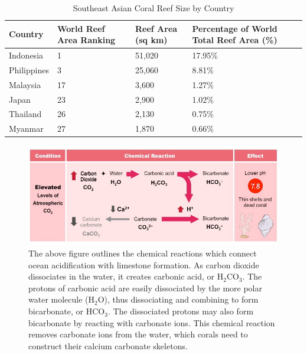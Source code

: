 \documentclass{book}\usepackage{knitr}
\begin{document}
\begin{knitrout}
\begin{kframe}
\begin{table}[h]
\caption{Southeast Asian Coral Reef Size by Country}
\label{tab:Southeast Asian Coral Reef Size by Country}
\begin{tabular}{llll}
Country     & World Reef Area Ranking & Reef Area (sq km) & Percentage of World Total Reef Area (\%) \\ 
\hline\hline
Indonesia   & 1                       & 51,020            & 17.95\% \\ 
\hline
Philippines & 3                       & 25,060            & 8.81\%  \\ 
\hline
Malaysia    & 17                      & 3,600             & 1.27\%  \\ 
\hline
Japan       & 23                      & 2,900             & 1.02\%  \\ 
\hline
Thailand    & 26                      & 2,130             & 0.75\%  \\ 
\hline
Myanmar     & 27                      & 1,870             & 0.66\%  \\
\end{tabular}
\end{table}

\begin{figure}
\includegraphics[width=\linewidth]{images/acidification2_med}
\caption{The above figure outlines the chemical reactions which connect ocean acidification with limestone formation. As carbon dioxide dissociates in the water, it creates carbonic acid, or H$_2$CO$_3$. The protons of carbonic acid are easily dissociated by the more polar water molecule (H$_2$O), thus dissociating and combining to form bicarbonate, or HCO$_3$. The dissociated protons may also form bicarbonate by reacting with carbonate ions. This chemical reaction removes carbonate ions from the water, which corals need to construct their calcium carbonate skeletons.}
\label{fig:Ocean Acidifcation Chemical Reaction and Its Carbonate Relation}
\end{figure}


\end{kframe}
\end{knitrout}
\end{document}
